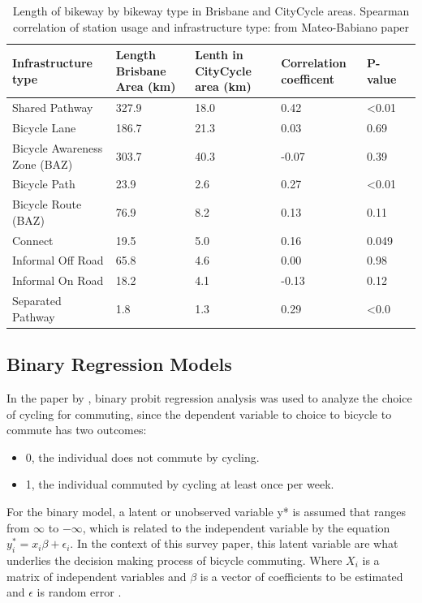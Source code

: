 \documentclass[12pt, letterpaper]{article}
\begin{document}
\begin{table}[tbp]
\small
\label{table:MB}
\centering
\caption{Length of bikeway by bikeway type in Brisbane and CityCycle areas. Spearman correlation of station usage and infrastructure type: from Mateo-Babiano paper}
\begin{tabular}{l*{5}{p{1.5cm}}}
\toprule
{Infrastructure type} & {Length Brisbane Area (km)} & {Lenth in CityCycle area (km)} & {Correlation coefficent} & {P-value}\\
\midrule
Shared Pathway & 327.9 & 18.0 & 0.42 & <0.01 \\
Bicycle Lane & 186.7 & 21.3 & 0.03 & 0.69 \\
Bicycle Awareness Zone (BAZ) & 303.7 & 40.3 & -0.07 & 0.39 \\
Bicycle Path & 23.9 & 2.6 & 0.27 & <0.01 \\
Bicycle Route (BAZ) & 76.9 & 8.2 & 0.13 & 0.11 \\
Connect & 19.5 & 5.0 & 0.16 & 0.049 \\
Informal Off Road & 65.8 & 4.6 & 0.00 & 0.98 \\
Informal On Road & 18.2 & 4.1 & -0.13 & 0.12 \\
Separated Pathway & 1.8 & 1.3 & 0.29 & <0.0 \\
\bottomrule
\end{tabular}
\end{table}


\subsection{Binary Regression Models}
\label{sec:bin}

In the paper by \citet{2Yujun2019}, binary probit regression analysis was used to analyze the choice of cycling for commuting, since the dependent variable to choice to bicycle to commute has two outcomes:

\begin{itemize}
    \item 0, the individual does not commute by cycling.
    \item 1, the individual commuted by cycling at least once per week.
\end{itemize}
    
For the binary model, a latent or unobserved variable y* is assumed that ranges from $\infty$ to $-\infty$, which is related to the independent variable by the equation $y^{*}_{i} = x_{i}\beta + \epsilon_{i}$. In the context of this survey paper, this latent variable are what underlies the decision making process of bicycle commuting. Where $X_{i}$ is a matrix of independent variables and $\beta$ is a vector of coefficients to be estimated and $\epsilon$ is random error \cite{LONG2001}. 
\end{document}
